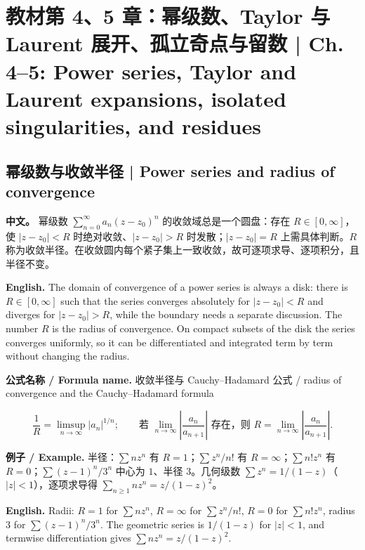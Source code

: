 \documentclass[UTF8,11pt,a4paper]{ctexart}
\newcommand{\EN}[1]{\par\noindent \textbf{English.} #1\par}
\newcommand{\FORMULA}[2]{\par\noindent\textbf{公式名称 / Formula name.} #1 / #2\par}
\newcommand{\EX}[2]{\par\noindent \textbf{例子 / Example.} #1\par\EN{#2}}
\newcommand{\APS}[2]{\par\noindent\textbf{中文。} #1\par\noindent\textbf{English.} #2\par\smallskip}
\begin{document}
\section[教材第 4、5 章 级数与留数]{教材第 4、5 章：幂级数、Taylor 与 Laurent 展开、孤立奇点与留数 | Ch. 4--5: Power series, Taylor and Laurent expansions, isolated singularities, and residues}

\subsection{幂级数与收敛半径 | Power series and radius of convergence}
\APS{幂级数 $\sum_{n=0}^{\infty}a_n(z-z_0)^n$ 的收敛域总是一个圆盘：存在 $R\in[0,\infty]$，使 $|z-z_0|<R$ 时绝对收敛、$|z-z_0|>R$ 时发散；$|z-z_0|=R$ 上需具体判断。$R$ 称为收敛半径。在收敛圆内每个紧子集上一致收敛，故可逐项求导、逐项积分，且半径不变。}{The domain of convergence of a power series is always a disk: there is $R\in[0,\infty]$ such that the series converges absolutely for $|z-z_0|<R$ and diverges for $|z-z_0|>R$, while the boundary needs a separate discussion. The number $R$ is the radius of convergence. On compact subsets of the disk the series converges uniformly, so it can be differentiated and integrated term by term without changing the radius.}
\FORMULA{收敛半径与 Cauchy--Hadamard 公式}{radius of convergence and the Cauchy--Hadamard formula}
\[
\frac1R=\limsup_{n\to\infty}|a_n|^{1/n};\qquad
\text{若 }\lim_{n\to\infty}\left|\frac{a_n}{a_{n+1}}\right|\text{ 存在，则 }R=\lim_{n\to\infty}\left|\frac{a_n}{a_{n+1}}\right|.
\]
\EX{半径：$\sum nz^n$ 有 $R=1$；$\sum z^n/n!$ 有 $R=\infty$；$\sum n!z^n$ 有 $R=0$；$\sum(z-1)^n/3^n$ 中心为 $1$、半径 $3$。几何级数 $\sum z^n=1/(1-z)$（$|z|<1$），逐项求导得 $\sum_{n\ge1}nz^n=z/(1-z)^2$。}{Radii: $R=1$ for $\sum nz^n$, $R=\infty$ for $\sum z^n/n!$, $R=0$ for $\sum n!z^n$, radius $3$ for $\sum(z-1)^n/3^n$. The geometric series is $1/(1-z)$ for $|z|<1$, and termwise differentiation gives $\sum nz^n=z/(1-z)^2$.}
\end{document}
